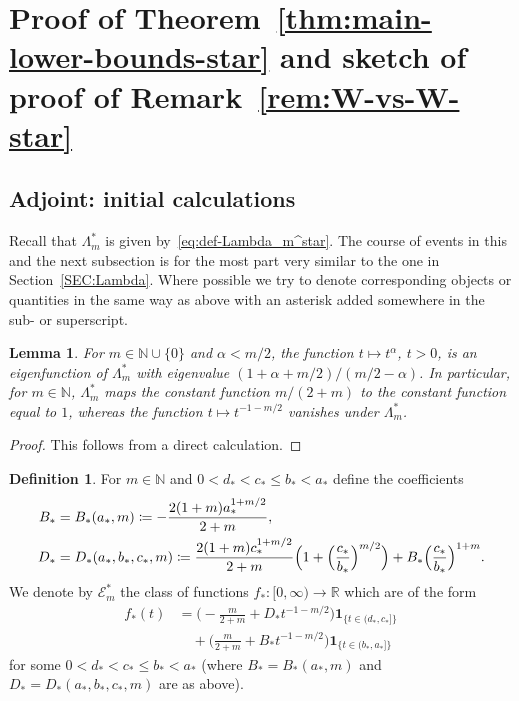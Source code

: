 \documentclass[a4paper]{amsart} %
\newtheorem{lemma}[theorem]{Lemma}
\theoremstyle{definition}
\newtheorem{definition}[theorem]{Definition}
\theoremstyle{remark}
\numberwithin{equation}{section}
\newcommand*{\RR}{\mathbb{R}}
\newcommand*{\NNzero}{\mathbb{N}\cup\{0\}}
\newcommand*{\NNone}{\mathbb{N}}
\newcommand*{\ind}[1]{\mathbf{1}_{#1}}
\newcommand*{\indbr}[1]{\ind{\{#1\}}}
\newcommand*{\fclassStar}[1]{\mathcal{E}_{#1}^*}
\newcommand*{\fStar}{f_{*}}
\newcommand*{\aStar}{a_*}
\newcommand*{\bStar}{b_*}
\newcommand*{\cStar}{c_*}
\newcommand*{\dStar}{d_*}
\newcommand*{\dOneStar}{D_*}%
\newcommand*{\dZeroStar}{B_*}%
\begin{document}
\section{Proof of Theorem~\ref{thm:main-lower-bounds-star} and sketch of proof of Remark~\ref{rem:W-vs-W-star}}

\label{sec:proof-thm-2}

\subsection{Adjoint: initial calculations}

Recall that $\Lambda_m^*$ is given by~\eqref{eq:def-Lambda_m^star}.
The course of events in this and the next subsection  is for the most part very similar 
to the one in Section~\ref{SEC:Lambda}.
Where possible we try to denote corresponding objects or quantities in the same way as above
with an asterisk added somewhere in the sub- or superscript. 

\begin{lemma}
	\label{lem:weak-type-eigenfunctions-star}
	For $m\in\NNzero$ and $\alpha < m/2$, the function $t\mapsto t^\alpha$, $t>0$,
	is an eigenfunction of $\Lambda_m^*$ with eigenvalue $(1+\alpha +m/2)/(m/2 - \alpha)$.	
	In particular, for $m\in \NNone$, $\Lambda_m^*$ maps the constant function $m/(2+m)$ to  the constant function equal to $1$,
	whereas the function $t\mapsto t^{-1-m/2}$ vanishes under $\Lambda_m^*$.
\end{lemma}

\begin{proof} This follows from a direct calculation.
\end{proof}

\begin{definition}
	\label{def:weak-type-extremals-2-star}
	For $m\in\NNone$ 
	and $0< \dStar{} < \cStar{} \leq \bStar{} < \aStar{}$
	define the coefficients
	\begin{align*}
	\dZeroStar{} &= 
	\dZeroStar(\aStar, m)
	\coloneqq -\frac{2(1+m) \aStar^{1+m/2}}{2+m},\\
	\dOneStar{} &= \dOneStar(\aStar, \bStar, \cStar, m) \coloneqq  \frac{2(1+m)\cStar^{1+m/2}}{2+m}  \Bigl( 1 + \Bigl(\frac{\cStar}{\bStar}\Bigr)^{m/2}\Bigr) + \dZeroStar{} \Bigl(\frac{\cStar}{\bStar}\Bigr)^{1+m}.
	\end{align*}
	We denote by $\fclassStar{m}$ the class of functions $\fStar{}\colon [0,\infty)\to\RR$
	which are of the form
	\begin{align}
	\label{eq:weak-type-extremals-2-star}
	\fStar(t) &=
	\bigl(-\frac{m}{2+m} +\dOneStar{} t^{-1-m/2}\bigr) \indbr{t\in(\dStar{},\cStar{}]}\\
		&\quad+
		\bigl(\frac{m}{2+m} + \dZeroStar{} t^{-1-m/2}\bigr) \indbr{t\in(\bStar{},\aStar{}]}
		\nonumber
	\end{align}
	for some  $0< \dStar{} < \cStar{} \leq \bStar{} < \aStar{}$ (where $\dZeroStar{} = \dZeroStar(\aStar,m)$ and $\dOneStar{} = \dOneStar(\aStar,\bStar,\cStar,m)$ are as above).
\end{definition}
\end{document}
